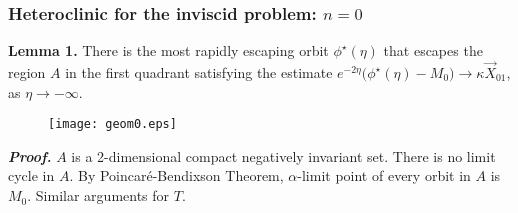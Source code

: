 \documentclass{beamer}
\def\red{\color{red}}
\def\blue{\color{blue}}
\begin{document}

\begin{frame}
 \frametitle{Heteroclinic for the inviscid problem: $n=0$}
 {\bf Lemma 1.} There is the most rapidly escaping orbit $\phi^\star(\eta)$ that escapes the region $A$ in the first quadrant satisfying the estimate
 $e^{-2\eta}\Big(\phi^\star(\eta)- M_0\Big) \rightarrow \kappa\vec{X}_{01}$, as $\eta \rightarrow -\infty$.
 \begin{figure}
  \centering
  \texttt{[image: geom0.eps]} \label{fig:flow0}  
%   
%   
 \end{figure}
 {\scriptsize
 {\bf \it Proof.}
  $A$ is a 2-dimensional compact negatively invariant set. There is no limit cycle in $A$. By Poincar\'e-Bendixson Theorem, $\alpha$-limit point of every orbit in $A$ is $M_0$. Similar arguments for $T$.
 }
\end{frame}
\end{document}
